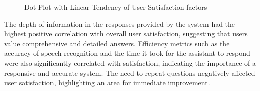 \documentclass[12pt]{article}
\begin{document}
\begin{figure}[bht]
	\begin{center}
	{}
	\end{center}
	\vspace{-5mm} %
    \caption{Dot Plot with Linear Tendency of User Satisfaction factors}
	\label{dotplot}
\end{figure}

The depth of information in the responses provided by the system had the highest positive correlation with overall user satisfaction, suggesting that users value comprehensive and detailed answers. Efficiency metrics such as the accuracy of speech recognition and the time it took for the assistant to respond were also significantly correlated with satisfaction, indicating the importance of a responsive and accurate system.
The need to repeat questions negatively affected user satisfaction, highlighting an area for immediate improvement.\\

\end{document}
